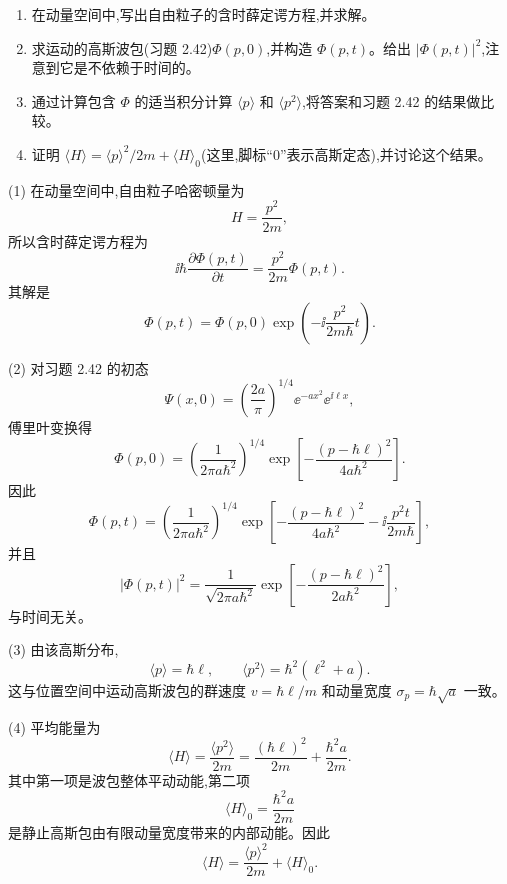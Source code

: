 \begin{question}
\begin{enumerate}
\item 在动量空间中,写出自由粒子的含时薛定谔方程,并求解。
\item 求运动的高斯波包(习题 2.42)$\Phi(p,0)$,并构造 $\Phi(p,t)$。给出 $|\Phi(p,t)|^2$,注意到它是不依赖于时间的。
\item 通过计算包含 $\Phi$ 的适当积分计算 $\langle p\rangle$ 和 $\langle p^2\rangle$,将答案和习题 2.42 的结果做比较。
\item 证明 $\langle H\rangle=\langle p\rangle^2/2m+\langle H\rangle_0$(这里,脚标“0”表示高斯定态),并讨论这个结果。
\end{enumerate}
\begin{solution}
(1) 在动量空间中,自由粒子哈密顿量为
\[
H=\frac{p^2}{2m},
\]
所以含时薛定谔方程为
\[
\ii\hbar\frac{\partial\Phi(p,t)}{\partial t}=\frac{p^2}{2m}\Phi(p,t).
\]
其解是
\[
\boxed{\Phi(p,t)=\Phi(p,0)\exp\left(-\ii\frac{p^2}{2m\hbar}t\right).}
\]

(2) 对习题 2.42 的初态
\[
\Psi(x,0)=\left(\frac{2a}{\pi}\right)^{1/4}\ee^{-ax^2}\ee^{\ii\ell x},
\]
傅里叶变换得
\[
\boxed{\Phi(p,0)=\left(\frac1{2\pi a\hbar^2}\right)^{1/4}
\exp\left[-\frac{(p-\hbar\ell)^2}{4a\hbar^2}\right].}
\]
因此
\[
\Phi(p,t)=\left(\frac1{2\pi a\hbar^2}\right)^{1/4}
\exp\left[-\frac{(p-\hbar\ell)^2}{4a\hbar^2}
-\ii\frac{p^2t}{2m\hbar}\right],
\]
并且
\[
|\Phi(p,t)|^2=\frac1{\sqrt{2\pi a\hbar^2}}
\exp\left[-\frac{(p-\hbar\ell)^2}{2a\hbar^2}\right],
\]
与时间无关。

(3) 由该高斯分布,
\[
\boxed{\langle p\rangle=\hbar\ell,}
\qquad
\boxed{\langle p^2\rangle=\hbar^2(\ell^2+a).}
\]
这与位置空间中运动高斯波包的群速度 $v=\hbar\ell/m$ 和动量宽度 $\sigma_p=\hbar\sqrt a$ 一致。

(4) 平均能量为
\[
\langle H\rangle=\frac{\langle p^2\rangle}{2m}
=\frac{(\hbar\ell)^2}{2m}+\frac{\hbar^2a}{2m}.
\]
其中第一项是波包整体平动动能,第二项
\[
\boxed{\langle H\rangle_0=\frac{\hbar^2a}{2m}}
\]
是静止高斯包由有限动量宽度带来的内部动能。因此
\[
\boxed{\langle H\rangle=\frac{\langle p\rangle^2}{2m}+\langle H\rangle_0.}
\]
\end{solution}
\end{question}
